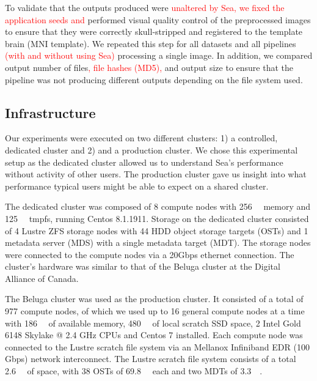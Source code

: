 \documentclass[pdflatex,sn-mathphys-num]{sn-jnl}
\newcommand{\vhs}[1]{\textcolor{red}{#1}}
\theoremstyle{thmstyleone}%
\theoremstyle{thmstyletwo}%
\theoremstyle{thmstylethree}%
\begin{document}
    To validate that the outputs produced were \vhs{unaltered by Sea, we fixed the application seeds and}
    performed visual quality control of the preprocessed images to ensure that
    they were correctly skull-stripped and registered to the template brain (MNI
    template). We repeated this step for all datasets and all pipelines \vhs{(with and without using Sea)}
    processing a single image. In addition, we compared output number of files\vhs{, file hashes (MD5),} 
    and output size to ensure that the pipeline was not producing different
    outputs depending on the file system used.
    
    
    \subsection{Infrastructure}
    
    Our experiments were executed on two different clusters: 1) a controlled, dedicated cluster
    and 2) and a production cluster. We chose this experimental setup as the dedicated
    cluster allowed us to understand Sea's performance without activity of other users.
    The production cluster gave us insight into what performance typical users might
    be able to expect on a shared cluster.

    The dedicated cluster was composed of 8
    compute nodes with \SI{256}{\gibi\byte} memory and \SI{125}{\gibi\byte}
    tmpfs, running Centos 8.1.1911.
    Storage on the dedicated cluster consisted of 4 Lustre ZFS storage nodes with 44
    HDD object storage targets (OSTs) and 1 metadata server (MDS) with a single
    metadata target (MDT). The storage nodes were connected to the compute nodes
    via a 20Gbps ethernet connection. The cluster's hardware was similar to that
    of the Beluga cluster at the Digital Alliance of Canada.
    
    The Beluga cluster was used as the production cluster.
    It consisted of a total of 977 compute nodes, of which we
    used up to 16 general compute nodes at a time with \SI{186}{\gibi\byte} of
    available memory, \SI{480}{\gibi\byte} of local scratch SSD space, 2 Intel
    Gold 6148 Skylake @ 2.4 GHz CPUs and Centos 7 installed. Each compute node
    was connected to the Lustre scratch file system via an Mellanox Infiniband
    EDR (100 Gbps) network interconnect. The Lustre scratch file system consists
    of a total \SI{2.6}{\pebi\byte} of space, with 38 OSTs of
    \SI{69.8}{\tebi\byte} each and two MDTs of \SI{3.3}{\tebi\byte}.
\end{document}
